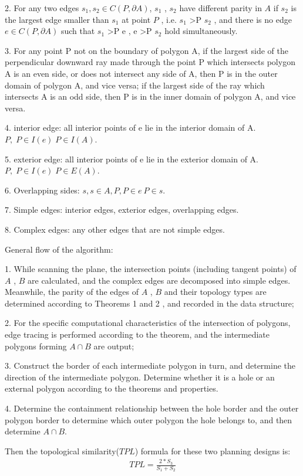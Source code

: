2. For any two edges $s_{1}, s_{2}\in  C(P,\partial A)$, $s_{1}$ , $s_{2}$ have different parity in $A$ if $s_{2}$ is the largest edge smaller than $s_{1}$ at point $P$ , i.e. $s_{1}$ >P $s_{2}$ , and there is no edge $e\in  C(P,\partial A)$ such that $s_{1}$ >P e , e >P $s_{2}$ hold simultaneously.

3. For any point P not on the boundary of polygon A, if the largest side of the perpendicular downward ray made through the point P which intersects polygon A is an even side, or does not intersect any side of A, then P is in the outer domain of polygon A, and vice versa; if the largest side of the ray which intersects A is an odd side, then P is in the inner domain of polygon A, and vice versa.

4. interior edge: all interior points of e lie in the interior domain of A. $P , \; P\in  I(e)\; P \in  I (A)$.

5. exterior edge: all interior points of e lie in the exterior domain of A. $P , \; P\in  I(e)\; P \in  E (A)$.

6. Overlapping sides: $s , s \in  A , P , P \in  e \ P \in  s$.

7. Simple edges: interior edges, exterior edges, overlapping edges.

8. Complex edges: any other edges that are not simple edges.

General flow of the algorithm:

1. While scanning the plane, the intersection points (including tangent points) of $A$ , $B$ are calculated, and the complex edges are decomposed into simple edges. Meanwhile, the parity of the edges of $A$ , $B$ and their topology types are determined according to Theorems 1 and 2 , and recorded in the data structure;

2. For the specific computational characteristics of the intersection of polygons, edge tracing is performed according to the theorem, and the intermediate polygons forming $A \cap  B$ are output;

3. Construct the border of each intermediate polygon in turn, and determine the direction of the intermediate polygon. Determine whether it is a hole or an external polygon according to the theorems and properties.

4. Determine the containment relationship between the hole border and the outer polygon border to determine which outer polygon the hole belongs to, and then determine $A \cap  B$.

Then the topological similarity($TPL$) formula for these two planning designs is:
\begin{equation}
\begin{split}
TPL=\frac{2*S_{3} }{S_{1}+S_{2}  } 
\end{split}
\end{equation}


